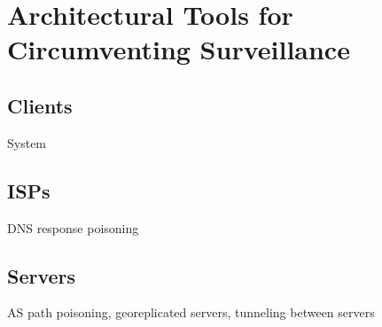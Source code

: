 \section{Architectural Tools for Circumventing Surveillance}

\subsection{Clients}
System

\subsection{ISPs}
DNS response poisoning

\subsection{Servers}
AS path poisoning, georeplicated servers, tunneling between servers
